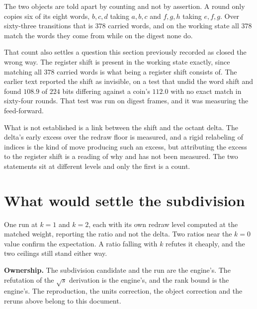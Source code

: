 The two objects are told apart by counting and not by assertion. A round only copies six of its eight words, \(b,c,d\) taking \(a,b,c\) and \(f,g,h\) taking \(e,f,g\). Over sixty-three transitions that is \(378\) carried words, and on the working state all \(378\) match the words they come from while on the digest none do.

That count also settles a question this section previously recorded as closed the wrong way. The register shift is present in the working state exactly, since matching all \(378\) carried words is what being a register shift consists of. The earlier text reported the shift as invisible, on a test that undid the word shift and found \(108.9\) of \(224\) bits differing against a coin's \(112.0\) with no exact match in sixty-four rounds. That test was run on digest frames, and it was measuring the feed-forward.

What is not established is a link between the shift and the octant delta. The delta's early excess over the redraw floor is measured, and a rigid relabeling of indices is the kind of move producing such an excess, but attributing the excess to the register shift is a reading of why and has not been measured. The two statements sit at different levels and only the first is a count.

\section{What would settle the subdivision}

One run at \(k = 1\) and \(k = 2\), each with its own redraw level computed at the matched weight, reporting the ratio and not the delta. Two ratios near the \(k = 0\) value confirm the expectation. A ratio falling with \(k\) refutes it cheaply, and the two ceilings still stand either way.

\textbf{Ownership.} The subdivision candidate and the run are the engine's. The refutation of the \(\sqrt{s}\) derivation is the engine's, and the rank bound is the engine's. The reproduction, the units correction, the object correction and the reruns above belong to this document.
